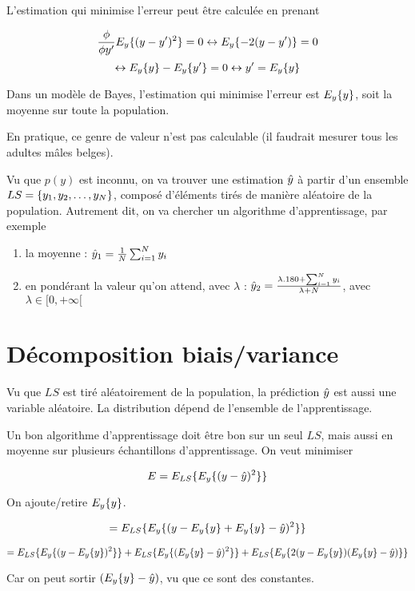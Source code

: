 	
	L'estimation qui minimise l'erreur peut être calculée en prenant 
	
	$$\frac{\phi}{\phi y'} E_y\{(y - y')^2\} = 0 \leftrightarrow E_y\{-2(y - y')\} = 0$$
	$$\leftrightarrow E_y\{y\} - E_y\{y'\} = 0 \leftrightarrow y' = E_y\{y\}$$
	
	Dans un modèle de Bayes, l'estimation qui minimise l'erreur est $E_y\{y\}$, soit la moyenne sur toute la population.
	
	En pratique, ce genre de valeur n'est pas calculable (il faudrait mesurer tous les adultes mâles belges).
	
	Vu que $p(y)$ est inconnu, on va trouver une estimation $\hat{y}$ à partir d'un ensemble $LS = \lbrace y_1, y_2, \dots , y_N \rbrace$, composé d'éléments tirés de manière aléatoire de la population. Autrement dit, on va chercher un algorithme d'apprentissage, par exemple
	
	\begin{enumerate}
		\item la moyenne : $\hat{y}_1 = \frac{1}{N} \sum_{i = 1}^N y_i$
		\item en pondérant la valeur qu'on attend, avec $\lambda$ : $\hat{y}_2 = \frac{\lambda . 180 + \sum_{i = 1}^N y_i}{\lambda + N}$, avec $\lambda \in [ 0, +\infty [ $
	\end{enumerate}
	
	\section{Décomposition biais/variance}
	
	Vu que $LS$ est tiré aléatoirement de la population, la prédiction $\hat{y}$ est aussi une variable aléatoire. La distribution dépend de l'ensemble de l'apprentissage.
	
	
	Un bon algorithme d'apprentissage doit être bon sur un seul $LS$, mais aussi en moyenne sur plusieurs échantillons d'apprentissage. On veut minimiser 
	
	$$E = E_{LS}\{E_y\{(y - \hat{y})^2\}\}$$
	
	On ajoute/retire $E_y\{y\}$.
	
	$$= E_{LS}\{E_y\{(y - E_y\{y\} + E_y\{y\} - \hat{y})^2\}\}$$
	
	$$= E_{LS}\{E_y\{(y - E_y\{y\})^2\}\} + E_{LS}\{E_y\{(E_y\{y\} - \hat{y})^2\}\} + E_{LS}\{E_y\{2(y - E_y\{y\})(E_y\{y\} - \hat{y})\}\}$$
	
	Car on peut sortir $(E_y\{y\} - \hat{y})$, vu que ce sont des constantes.
	
